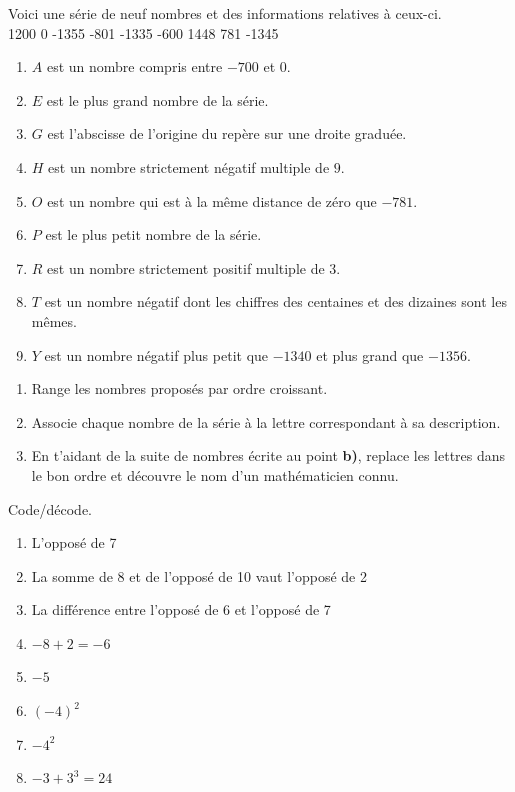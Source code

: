 \documentclass[../../syllabus_1.tex]{subfiles}
\begin{document}
\begin{exercise}
    Voici une série de neuf nombres et des informations relatives à ceux-ci.\\ 

    1200 \hfil 0 \hfil -1355 \hfil -801 \hfil -1335 \hfil -600 \hfil 1448 \hfil 781 \hfil -1345  

    \begin{enumerate}[label=\ ]
        \item \(A\) est un nombre compris entre \(- 700\) et \(0\).
        \item \(E\) est le plus grand nombre de la série.
        \item \(G\) est l'abscisse de l'origine du repère sur une droite graduée.
        \item \(H\) est un nombre strictement négatif multiple de \(9\).
        \item \(O\) est un nombre qui est à la même distance de zéro que \(- 781\).
        \item \(P\) est le plus petit nombre de la série.
        \item \(R\) est un nombre strictement positif multiple de \(3\).
        \item \(T\) est un nombre négatif dont les chiffres des centaines et des dizaines sont les mêmes.
        \item \(Y\) est un nombre négatif plus petit que \(- 1340\) et plus grand que \(- 1356\).
    \end{enumerate}
    \begin{enumerate}
        \item Range les nombres proposés par ordre croissant.
        \item Associe chaque nombre de la série à la lettre correspondant à sa description.
        \item En t'aidant de la suite de nombres écrite au point \textbf{b)}, replace les lettres dans le bon ordre et découvre le nom d'un mathématicien connu.
    \end{enumerate}
\end{exercise}

\begin{exercise}
    Code/décode.
    \begin{enumerate}[cols=2]
        \item L'opposé de 7
        \item La somme de 8 et de l'opposé de 10 vaut l'opposé de 2
        \item La différence entre l'opposé de 6 et l'opposé de 7
        \item $-8+2=-6$
        \item $-5$
        \item $(-4)^2$
        \item $-4^2$
        \item $-3+3^3=24$
    \end{enumerate}
\end{exercise}
\end{document}
